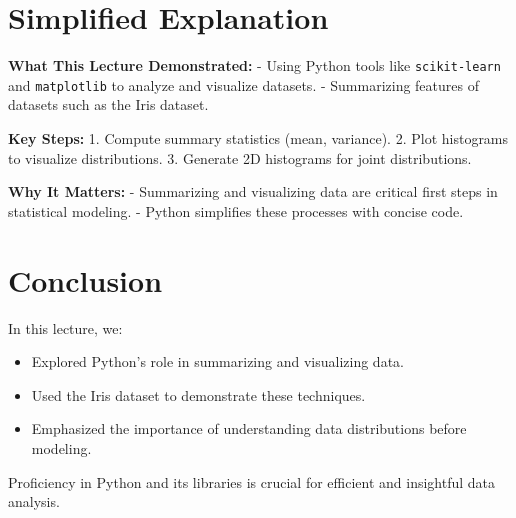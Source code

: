 \documentclass{article}
\begin{document}
\section*{Simplified Explanation}

\textbf{What This Lecture Demonstrated:}
- Using Python tools like \texttt{scikit-learn} and \texttt{matplotlib} to analyze and visualize datasets.
- Summarizing features of datasets such as the Iris dataset.

\textbf{Key Steps:}
1. Compute summary statistics (mean, variance).
2. Plot histograms to visualize distributions.
3. Generate 2D histograms for joint distributions.

\textbf{Why It Matters:}
- Summarizing and visualizing data are critical first steps in statistical modeling.
- Python simplifies these processes with concise code.

\section*{Conclusion}

In this lecture, we:
\begin{itemize}
  \item Explored Python's role in summarizing and visualizing data.
  \item Used the Iris dataset to demonstrate these techniques.
  \item Emphasized the importance of understanding data distributions before modeling.
\end{itemize}

Proficiency in Python and its libraries is crucial for efficient and insightful data analysis.
\end{document}
